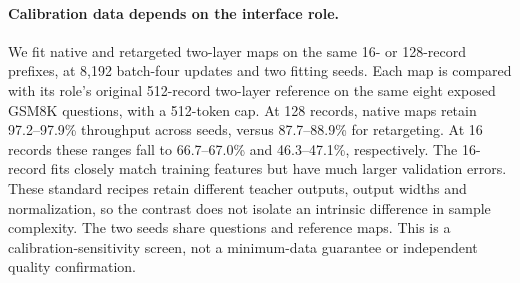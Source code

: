 \paragraph{Calibration data depends on the interface role.}
We fit native and retargeted two-layer maps on the same 16- or 128-record
prefixes, at 8,192 batch-four updates and two fitting seeds. Each map is
compared with its role's original 512-record two-layer reference on the
same eight exposed GSM8K questions, with a 512-token cap.
At 128 records, native maps retain 97.2--97.9\% throughput across seeds, versus 87.7--88.9\% for retargeting. At 16 records these ranges fall to 66.7--67.0\% and 46.3--47.1\%, respectively.
The 16-record fits closely match training features but have much larger
validation errors. These standard recipes retain different teacher outputs,
output widths and normalization, so the contrast does not isolate an
intrinsic difference in sample complexity. The two seeds share questions
and reference maps. This is a calibration-sensitivity screen, not a
minimum-data guarantee or independent quality confirmation.
